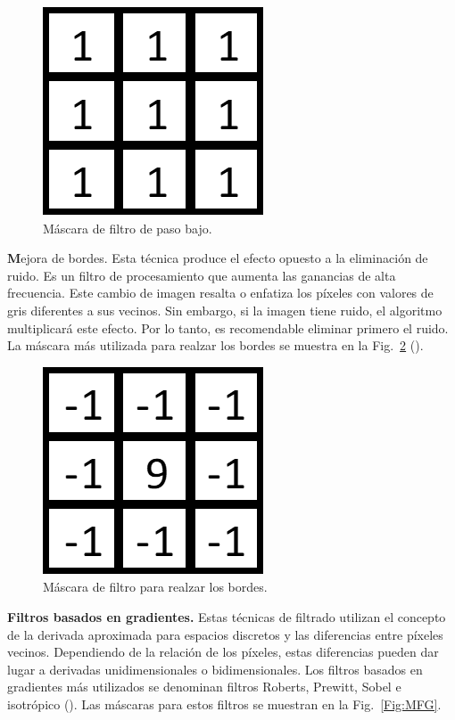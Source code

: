 \documentclass[11pt,a4paper,openany]{article}
\begin{document}
    \begin{figure}[H]
    \centering
        \includegraphics[scale=0.4]{masc-filtro-pb.png}
        \caption{Máscara de filtro de paso bajo.}\label{Fig:MFPB}
    \end{figure}

    {\textbf Mejora de bordes.} Esta técnica produce el efecto opuesto a la eliminación de ruido. Es un filtro de procesamiento que aumenta las ganancias de alta frecuencia. Este cambio de imagen resalta o enfatiza los píxeles con valores de gris diferentes a sus vecinos. Sin embargo, si la imagen tiene ruido, el algoritmo multiplicará este efecto. Por lo tanto, es recomendable eliminar primero el ruido. La máscara más utilizada para realzar los bordes se muestra en la Fig.~\ref{Fig:MFRB} (\cite{Esqueda2005}).\\

    \begin{figure}[H]
    \centering
        \includegraphics[scale=0.4]{masc-filtro-RB.png}
        \caption{Máscara de filtro para realzar los bordes.}\label{Fig:MFRB}
    \end{figure}

    {\bf Filtros basados en gradientes.} Estas técnicas de filtrado utilizan el concepto de la derivada aproximada para espacios discretos y las diferencias entre píxeles vecinos. Dependiendo de la relación de los píxeles, estas diferencias pueden dar lugar a derivadas unidimensionales o bidimensionales. Los filtros basados en gradientes más utilizados se denominan filtros Roberts, Prewitt, Sobel e isotrópico (\cite{Kumar2016}). Las máscaras para estos filtros se muestran en la Fig.~\ref{Fig:MFG}.
\end{document}
